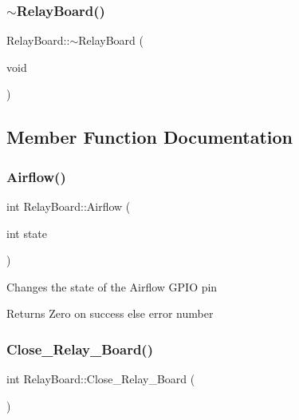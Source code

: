 \mbox{\label{classRelayBoard_af05bb34a287c76312104a427c86c658e}} 
\subsubsection{\texorpdfstring{$\sim$\+Relay\+Board()}{~RelayBoard()}}
{\footnotesize\ttfamily Relay\+Board\+::$\sim$\+Relay\+Board (\begin{DoxyParamCaption}\item[{void}]{ }\end{DoxyParamCaption})\hspace{0.3cm}{\ttfamily [inline]}}



\subsection{Member Function Documentation}
\mbox{\label{classRelayBoard_aa14251b65f8b4872cdf95c56951f0959}} 
\subsubsection{\texorpdfstring{Airflow()}{Airflow()}}
{\footnotesize\ttfamily int Relay\+Board\+::\+Airflow (\begin{DoxyParamCaption}\item[{int}]{state }\end{DoxyParamCaption})}

Changes the state of the Airflow G\+P\+IO pin

\begin{DoxyReturn}{Returns}
Zero on success else error number 
\end{DoxyReturn}
\mbox{\label{classRelayBoard_a8d4fba9b90f8a65a0f02ad9d5a35c148}} 
\subsubsection{\texorpdfstring{Close\+\_\+\+Relay\+\_\+\+Board()}{Close\_Relay\_Board()}}
{\footnotesize\ttfamily int Relay\+Board\+::\+Close\+\_\+\+Relay\+\_\+\+Board (\begin{DoxyParamCaption}{ }\end{DoxyParamCaption})}

